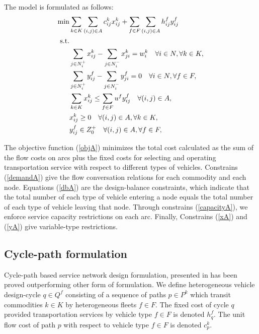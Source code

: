 \documentclass[11pt,nonblindrev,fleqn]{article}
\begin{document}
The model is formulated as follows:
\begin{align}
  \min & \sum_{k\in K}\sum_{(i,j)\in A} c_{ij}^k x_{ij}^k + \sum_{f\in F}\sum_{(i,j)\in A}h_{ij}^f y_{ij}^f    \label{objA}  \\
  \rm{s.t.} \nonumber  \\
         &  \sum_{j\in N_i^+}x_{ij}^k - \sum_{j\in N_i^-}x_{ji}^k = w_i^k     \quad     \forall i\in N, \forall k\in K,     \label{demandA}  \\
         &   \sum_{j\in N_i^+}y_{ij}^f - \sum_{j\in N_i^-}y_{ji}^f = 0  \quad     \forall i\in N, \forall f\in F,   \label{dbA} \\
         &   \sum_{k\in K}x_{ij}^k \leq \sum_{f\in F}u^f y_{ij}^f  \quad  \forall (i,j)\in A,   \label{capacityA} \\
         &    x_{ij}^k \geq 0  \quad  \forall (i,j)\in A, \forall k\in K,   \label{xA} \\
         &   y_{ij}^f \in Z_0^+  \quad  \forall (i,j)\in A,\forall f\in F, \label{yA}
\end{align}

The objective function (\ref{objA}) minimizes the total cost calculated as the sum of the flow costs on arcs plus the fixed costs for selecting and operating transportation service with respect to different types of vehicles. Constrains (\ref{demandA}) give the flow conversation relations for each commodity and each node. Equations (\ref{dbA}) are the design-balance constraints, which indicate that the total number of each type of vehicle entering a node equals the total number of each type of vehicle leaving that node. Through constrains (\ref{capacityA}), we enforce service capacity restrictions on each arc. Finally, Constrains (\ref{xA}) and (\ref{yA}) give variable-type restrictions.

\subsection{Cycle-path formulation}
Cycle-path based service network design formulation, presented in \cite{Andersen2011Branch} has been proved outperforming other form of formulation. We define heterogeneous vehicle design-cycle $q\in Q^f$ consisting of a sequence of paths $p\in P^k$ which transit commodities $k\in K$ by heterogeneous fleets $f\in F$. The fixed cost of cycle $q$ provided transportation services by vehicle type $f\in F$ is denoted $h_q^f$. The unit flow cost of path $p$ with respect to vehicle type $f\in F$ is denoted $c_p^k$.
\end{document}
